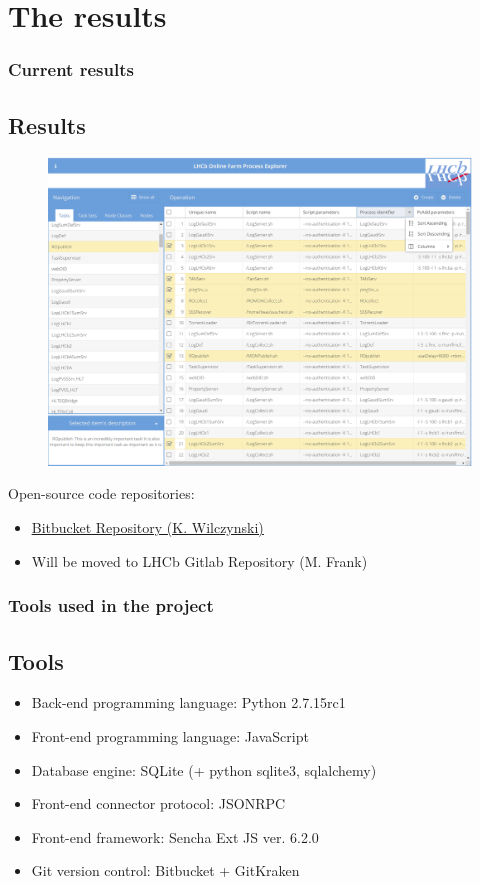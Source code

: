 \documentclass{beamer}
\begin{document}
\section{The results}
\begin{frame}
\frametitle{Current results}
\subsection{Results}
\begin{figure}[H]
    	\centering
    	\includegraphics[scale=0.15]{images/gui.png}
\end{figure}
\begin{block}{Open-source code repositories:}
\begin{itemize}
\item \underline{\href{https://bitbucket.org/3sztof/lhcb_online/src/master/}{Bitbucket Repository (K. Wilczynski)}} 
\item Will be moved to LHCb Gitlab Repository (M. Frank)
\end{itemize}
\end{block}
\end{frame}

\begin{frame}
\frametitle{Tools used in the project}
\subsection{Tools}

\begin{itemize}
\item Back-end programming language: Python 2.7.15rc1
\item Front-end programming language: JavaScript
\item Database engine: SQLite (+ python sqlite3, sqlalchemy)
\item Front-end connector protocol: JSONRPC
\item Front-end framework: Sencha Ext JS ver. 6.2.0
\item Git version control: Bitbucket + GitKraken
\end{itemize}

\end{frame}
\end{document}
